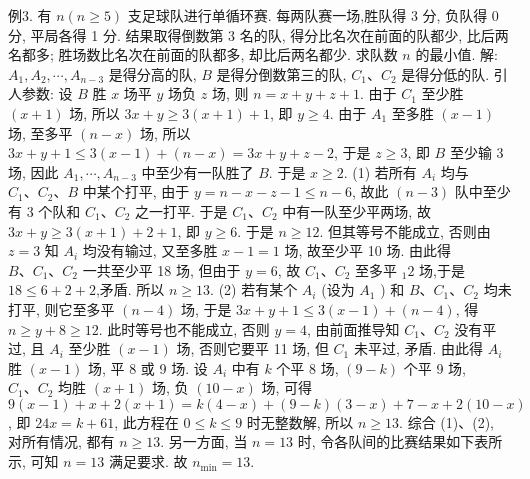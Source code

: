 例3. 有 $n(n \geqslant 5)$ 支足球队进行单循环赛.
每两队赛一场,胜队得 3 分, 负队得 0 分, 平局各得 1 分.
结果取得倒数第 3 名的队, 得分比名次在前面的队都少, 比后两名都多; 胜场数比名次在前面的队都多, 却比后两名都少.
求队数 $n$ 的最小值.
解: $A_1, A_2, \cdots, A_{n-3}$ 是得分高的队, $B$ 是得分倒数第三的队, $C_1 、 C_2$ 是得分低的队.
引人参数: 设 $B$ 胜 $x$ 场平 $y$ 场负 $z$ 场, 则 $n=x+y+z+1$. 由于 $C_1$ 至少胜 $(x+1)$ 场, 所以 $3 x+y \geqslant 3(x+1)+1$, 即 $y \geqslant 4$. 由于 $A_1$ 至多胜 $(x-1)$ 场, 至多平 $(n-x)$ 场, 所以 $3 x+y+1 \leqslant 3(x-1)+(n-x)= 3 x+y+z-2$, 于是 $z \geqslant 3$, 即 $B$ 至少输 3 场, 因此 $A_1, \cdots, A_{n-3}$ 中至少有一队胜了 $B$. 于是 $x \geqslant 2$.
(1) 若所有 $A_i$ 均与 $C_1 、 C_2 、 B$ 中某个打平, 由于 $y=n-x-z-1 \leqslant n-6$, 故此 $(n-3)$ 队中至少有 3 个队和 $C_1 、 C_2$ 之一打平.
于是 $C_1 、 C_2$ 中有一队至少平两场, 故 $3 x+y \geqslant 3(x+1)+2+1$, 即 $y \geqslant 6$. 于是 $n \geqslant 12$. 但其等号不能成立, 否则由 $z=3$ 知 $A_i$ 均没有输过, 又至多胜 $x-1=1$ 场, 故至少平 10 场.
由此得 $B 、 C_1 、 C_2$ 一共至少平 18 场, 但由于 $y=6$, 故 $C_1 、 C_2$ 至多平 ${ }_1 2$ 场,于是 $18 \leqslant 6+2+2$,矛盾.
所以 $n \geqslant 13$.
(2) 若有某个 $A_i$ (设为 $A_1$ ) 和 $B 、 C_1 、 C_2$ 均未打平, 则它至多平 $(n-4)$ 场, 于是 $3 x+y+1 \leqslant 3(x-1)+(n-4)$, 得 $n \geqslant y+8 \geqslant 12$. 此时等号也不能成立, 否则 $y=4$, 由前面推导知 $C_1 、 C_2$ 没有平过, 且 $A_i$ 至少胜 $(x-1)$ 场, 否则它要平 11 场, 但 $C_1$ 未平过, 矛盾.
由此得 $A_i$ 胜 $(x-1)$ 场, 平 8 或 9 场.
设 $A_i$ 中有 $k$ 个平 8 场, $(9-k)$ 个平 9 场, $C_1 、 C_2$ 均胜 $(x+1)$ 场, 负 $(10-x)$ 场, 可得 $9(x-1)+x+2(x+1)=k(4-x)+(9-k)(3-x)+7-x+2(10-x)$, 即 $24 x=k+61$, 此方程在 $0 \leqslant k \leqslant 9$ 时无整数解, 所以 $n \geqslant 13$.
综合 (1)、(2), 对所有情况, 都有 $n \geqslant 13$.
另一方面, 当 $n=13$ 时, 令各队间的比赛结果如下表所示, 可知 $n=13$ 满足要求.
故 $n_{\min }=13$.
